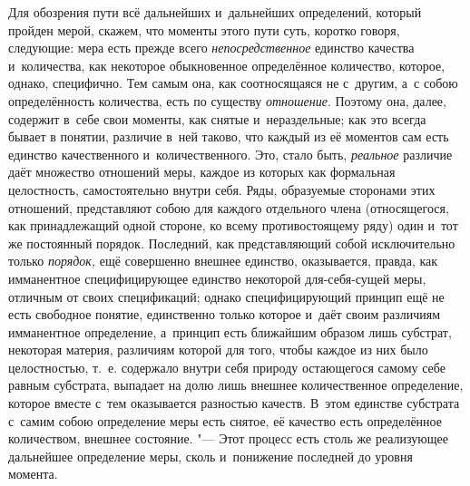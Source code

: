 Для обозрения пути всё дальнейших и~дальнейших определений, который пройден
мерой, скажем, что моменты этого пути суть, коротко говоря, следующие: мера
есть прежде всего {\em непосредственное} единство качества и~количества, как
некоторое обыкновенное определённое количество, которое, однако, специфично.
Тем самым она, как соотносящаяся не с~другим, а~с собою определённость
количества, есть по существу {\em отношение}. Поэтому она, далее, содержит
в~себе свои моменты, как снятые и~нераздельные; как это всегда бывает
в понятии, различие в~ней таково, что каждый из её моментов сам есть единство
качественного и~количественного. Это, стало быть, {\em реальное} различие даёт
множество отношений меры, каждое из которых как формальная целостность,
самостоятельно внутри себя. Ряды, образуемые сторонами этих отношений,
представляют собою для каждого отдельного члена (относящегося, как
принадлежащий одной стороне, ко всему противостоящему ряду) один и~тот же
постоянный порядок. Последний, как представляющий собой исключительно только
{\em порядок,} ещё совершенно внешнее единство, оказывается, правда, как
имманентное специфицирующее единство некоторой для-себя-сущей меры, отличным
от своих спецификаций; однако специфицирующий принцип ещё не есть свободное
понятие, единственно только которое и~даёт своим различиям имманентное
определение, а~принцип есть ближайшим образом лишь субстрат, некоторая материя,
различиям которой для того, чтобы каждое из них было целостностью, т.~е.
содержало внутри себя природу остающегося самому себе равным субстрата,
выпадает на долю лишь внешнее количественное определение, которое вместе
с~тем оказывается разностью качеств. В~этом единстве субстрата с~самим собою
определение меры есть снятое, её качество есть определённое количеством,
внешнее состояние. "--- Этот процесс есть столь же реализующее дальнейшее
определение меры, сколь и~понижение последней до уровня момента.
